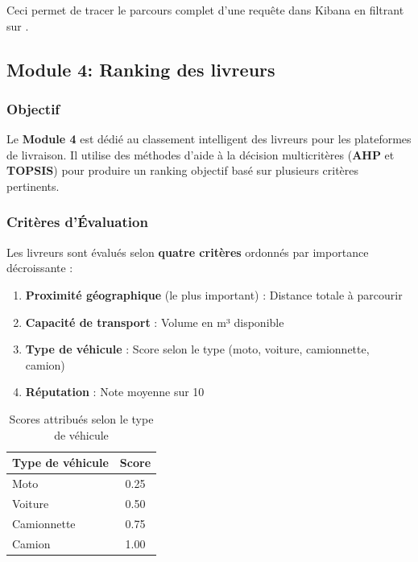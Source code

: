 \documentclass[11pt,a4paper]{report}
\begin{document}
Ceci permet de tracer le parcours complet d'une requête dans Kibana en filtrant sur .
\subsection{Module 4: Ranking des livreurs}

\label{subsec:module4_ranking}

\subsubsection{Objectif}
Le \textbf{Module 4} est dédié au classement intelligent des livreurs pour les plateformes de livraison. Il utilise des méthodes d'aide à la décision multicritères (\textbf{AHP} et \textbf{TOPSIS}) pour produire un ranking objectif basé sur plusieurs critères pertinents.

\subsubsection{Critères d'Évaluation}

Les livreurs sont évalués selon \textbf{quatre critères} ordonnés par importance décroissante :

\begin{enumerate}
    \item \textbf{Proximité géographique} (le plus important) : Distance totale à parcourir
    \item \textbf{Capacité de transport} : Volume en m³ disponible
    \item \textbf{Type de véhicule} : Score selon le type (moto, voiture, camionnette, camion)
    \item \textbf{Réputation} : Note moyenne sur 10
\end{enumerate}

\begin{table}[H]
    \centering
    \caption{Scores attribués selon le type de véhicule}
    \label{tab:vehicle_scores}
    \begin{tabular}{|l|c|}
        \hline
        \textbf{Type de véhicule} & \textbf{Score} \\
        \hline
        Moto & 0.25 \\
        Voiture & 0.50 \\
        Camionnette & 0.75 \\
        Camion & 1.00 \\
        \hline
    \end{tabular}
\end{table}
\end{document}

